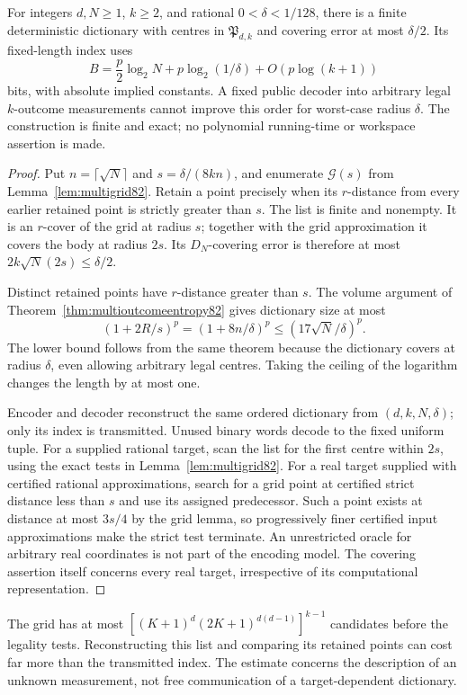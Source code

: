 \begin{theorem}
\label{thm:multioutcomecode82}
For integers $d,N\ge1$, $k\ge2$, and rational
$0<\delta<1/128$, there is a finite deterministic dictionary with
centres in $\mathfrak P_{d,k}$ and covering error at most $\delta/2$.
Its fixed-length index uses
\begin{equation}\label{eq:multicodebits82}
 B=\frac p2\log_2N+p\log_2(1/\delta)+O(p\log(k+1))
\end{equation}
bits, with absolute implied constants.  A fixed public decoder into
arbitrary legal $k$-outcome measurements cannot improve this order
for worst-case radius $\delta$.  The construction is finite and
exact; no polynomial running-time or workspace assertion is made.
\end{theorem}
\begin{proof}
Put $n=\lceil\sqrt N\rceil$ and $s=\delta/(8kn)$, and enumerate
$\mathcal G(s)$ from Lemma~\ref{lem:multigrid82}.
Retain a point precisely when its $r$-distance from every earlier
retained point is strictly greater than $s$.  The list is finite
and nonempty.  It is an $r$-cover of the grid at radius $s$;
together with the grid approximation it covers the body at radius
$2s$.  Its $D_N$-covering error is therefore at most
$2k\sqrt N(2s)\le\delta/2$.

Distinct retained points have $r$-distance greater than $s$.
The volume argument of Theorem~\ref{thm:multioutcomeentropy82}
gives dictionary size at most
\[
 (1+2R/s)^p=(1+8n/\delta)^p
             \le(17\sqrt N/\delta)^p.
\]
The lower bound follows from the same theorem because the dictionary
covers at radius $\delta$, even allowing arbitrary legal centres.
Taking the ceiling of the logarithm changes the length by at most one.

Encoder and decoder reconstruct the same ordered dictionary from
$(d,k,N,\delta)$; only its index is transmitted.  Unused binary
words decode to the fixed uniform tuple.  For a supplied rational
target, scan the list for the first centre within $2s$, using the
exact tests in Lemma~\ref{lem:multigrid82}.
For a real target supplied with certified rational approximations,
search for a grid point at certified strict distance less than $s$
and use its assigned predecessor.  Such a point exists at distance
at most $3s/4$ by the grid lemma, so progressively finer certified
input approximations make the strict test terminate.  An unrestricted oracle for arbitrary real
coordinates is not part of the encoding model.  The covering
assertion itself concerns every real target, irrespective of its
computational representation.
\end{proof}

The grid has at most
$[(K+1)^d(2K+1)^{d(d-1)}]^{k-1}$ candidates before the legality
tests.  Reconstructing this list and comparing its retained points
can cost far more than the transmitted index.  The estimate concerns
the description of an unknown measurement, not free communication
of a target-dependent dictionary.
